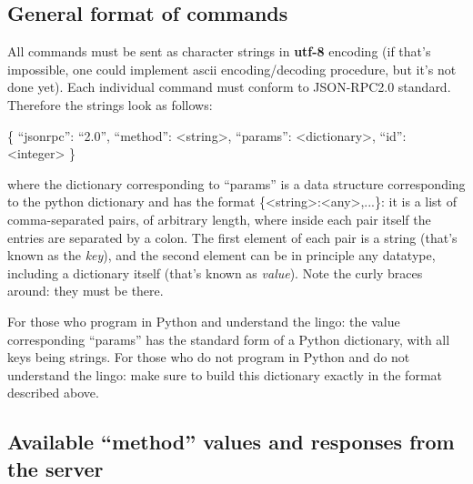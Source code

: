 \documentclass[11pt]{article} %
\begin{document}
\subsection{General format of commands}

All commands must be sent as character strings in \textbf{utf-8} encoding (if that's impossible, one could implement ascii encoding/decoding procedure, but it's not done yet). Each individual command must conform to JSON-RPC2.0 standard. Therefore the strings look as follows:

\begin{tcolorbox}[title=JSON-RPC2.0 command format]


{\selectfont \{ ``jsonrpc'': ``2.0'', ``method'': <string>, ``params'': <dictionary>, ``id'': <integer> \}}

where the dictionary corresponding to ``params'' is a data structure corresponding to the python dictionary and has the format \{<string>:<any>,...\}: it is a list of comma-separated pairs, of arbitrary length, where inside each pair itself the entries are separated by a colon. The first element of each pair is a string (that's known as the \textit{key}), and the second element can be in principle any datatype, including a dictionary itself (that's known as \textit{value}). Note the curly braces around: they must be there. 

For those who program in Python and understand the lingo: the value corresponding ``params'' has the standard form of a Python dictionary, with all keys being strings. For those who do not program in Python and do not understand the lingo: make sure to build this dictionary exactly in the format described above. 

\end{tcolorbox}


\subsection{Available ``method'' values and responses from the server}
\end{document}
